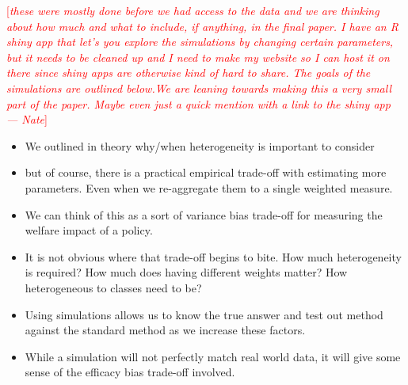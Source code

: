 \documentclass[12pt]{article}
\theoremstyle{definition}
\theoremstyle{definition}
\theoremstyle{definition}
\theoremstyle{definition}
\newcommand\cmnt[2]{\;
{\textcolor{red}{[{\em #1 --- #2}] \;}
}}
\newcommand\nate[1]{\cmnt{#1}{Nate}}
\begin{document}
        \nate{these were mostly done before we had access to the data and we are thinking about how much and what to include, if anything, in the final paper. I have an R shiny app that let's you explore the simulations by changing certain parameters, but it needs to be cleaned up and I need to make my website so I can host it on there since shiny apps are otherwise kind of hard to share. The goals of the simulations are outlined below.We are leaning towards making this a very small part of the paper. Maybe even just a quick mention with a link to the shiny app}
        \begin{itemize}
            \item We outlined in theory why/when heterogeneity is important to consider
            \item but of course, there is a practical empirical trade-off with estimating more parameters. Even when we re-aggregate them to a single weighted measure. 
            \item We can think of this as a sort of variance bias trade-off for measuring the welfare impact of a policy. 
            \item It is not obvious where that trade-off begins to bite. How much heterogeneity is required? How much does having different weights matter? How heterogeneous to classes need to be? 
            \item Using simulations allows us to know the true answer and test out method against the standard method as we increase these factors. 
            \item While a simulation will not perfectly match real world data, it will give some sense of the efficacy bias trade-off involved. 
            
        \end{itemize}
        
        

\end{document}
